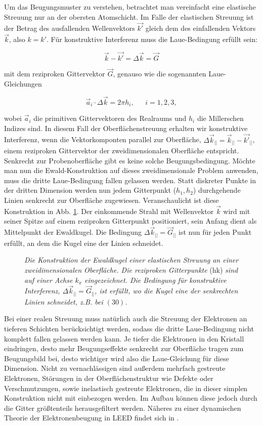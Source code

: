 Um das Beugungsmuster zu verstehen, betrachtet man vereinfacht eine elastische
Streuung nur an der obersten Atomschicht. Im Falle der elastischen Streuung ist
der Betrag des ausfallenden Wellenvektors $\vec{k'}$ gleich dem des
einfallenden Vektors $\vec{k}$, also $k=k'$. Für konstruktive Interferenz
muss die Laue-Bedingung erfüllt sein:

\[\vec{k}-\vec{k'}=\Delta \vec{k}=\vec{G}\]

mit dem reziproken Gittervektor $\vec{G}$, genauso wie die sogenannten Laue-Gleichungen

\[\vec{a}_i\cdot \Delta \vec{k}=2\pi h_i,~~~~~~~i=1, 2, 3,\]

wobei $\vec{a}_i$ die primitiven Gittervektoren des Realraums und $h_i$ die Millerschen Indizes
sind. In diesem Fall der Oberflächenstreuung erhalten wir konstruktive Interferenz,
wenn die Vektorkomponten parallel zur Oberfläche, $\Delta\vec{k}_{||}=\vec{k}_{||}-\vec{k'}_{||}$,
einem reziproken Gittervektor der zweidimensionalen Oberfläche entspricht. Senkrecht zur Probenoberfläche
gibt es keine solche Beugungsbedingung. Möchte man nun die Ewald-Konstruktion auf dieses
zweidimensionale Problem anwenden, muss die dritte Laue-Bedingung fallen gelassen werden. Statt
diskreter Punkte in der dritten Dimension werden nun jedem Gitterpunkt ($h_1, h_2$) durchgehende
Linien senkrecht zur Oberfläche zugewiesen. Veranschaulicht ist diese Konstruktion in Abb.
\ref{ewald}. Der einkommende Strahl mit Wellenvektor $\vec{k}$ wird mit seiner Spitze auf einem
reziproken Gitterpunkt positioniert, sein Anfang dient als Mittelpunkt der Ewaldkugel. Die
Bedingung $\Delta \vec{k}_{||}=\vec{G}_{||}$ ist nun für jeden Punkt erfüllt, an dem die Kugel eine
der Linien schneidet. 

\begin{figure}[H]
\centering
\sffamily 

\caption{\textit{Die Konstruktion der Ewaldkugel einer elastischen Streuung an einer
zweidimensionalen Oberfläche. Die reziproken Gitterpunkte} (hk) \textit{sind auf einer Achse $k_x$
eingezeichnet. Die Bedingung für konstruktive Interferenz, $\Delta \vec{k}_{||}=\vec{G}_{||}$,  ist erfüllt, wo die Kugel eine der senkrechten Linien
schneidet, z.B. bei $(30)$. }}
\label{ewald}
\end{figure}

Bei einer realen Streuung muss natürlich auch die Streuung der Elektronen an tieferen
Schichten berücksichtigt werden, sodass die dritte Laue-Bedingung nicht komplett fallen gelassen werden
kann. Je tiefer die Elektronen in den Kristall eindringen, desto mehr Beugungseffekte senkrecht zur
Oberfläche tragen zum Beugungsbild bei, desto wichtiger wird also die Laue-Gleichung für diese
Dimension. Nicht zu vernachlässigen sind außerdem mehrfach gestreute Elektronen, Störungen in der
Oberflächenstruktur wie Defekte oder Verschmutzungen, sowie inelastisch gestreute Elektronen, die in
dieser simplen Konstruktion nicht mit einbezogen werden. Im Aufbau können diese jedoch durch die
Gitter größtenteils herausgefiltert werden. Näheres zu einer dynamischen Theorie der
Elektronenbeugung in LEED findet sich in \cite{Lueth}.

\FloatBarrier










